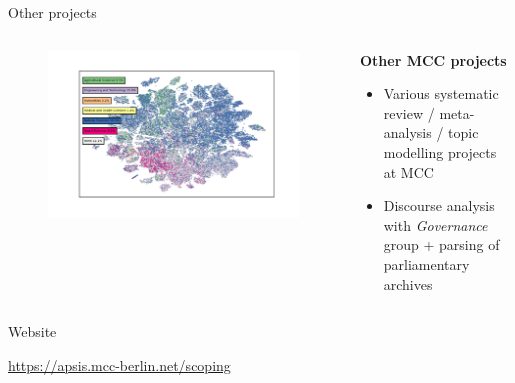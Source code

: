 \documentclass[9pt]{beamer}
\begin{document}
\begin{frame}[t]{Other projects}
\begin{columns}[t]
\begin{column}{0.33\linewidth}
		\begin{figure}
			\includegraphics[width=\linewidth]{images/run_665_s_100000_p50_oecds.png}
		\end{figure}
	\end{column}
	\begin{column}{0.33\linewidth}
	\centering \textbf{ Other MCC projects }
	\begin{itemize}
		\item Various systematic review / meta-analysis / topic modelling projects at MCC
		\item Discourse analysis with \textit{Governance} group + parsing of parliamentary archives
	\end{itemize}
	\end{column}	
\end{columns}

\end{frame}






\begin{frame}{Website}

\url{https://apsis.mcc-berlin.net/scoping}

\end{frame}




\end{document}
